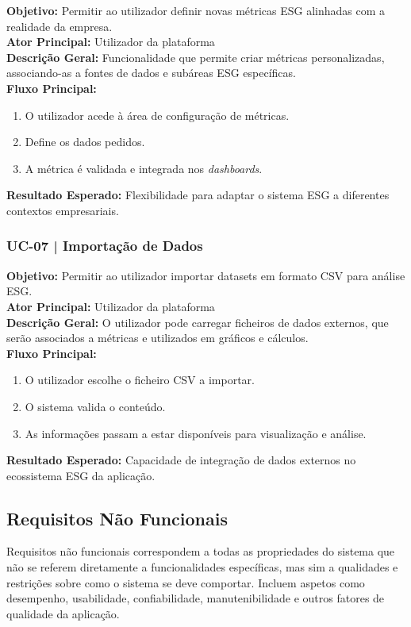 \textbf{Objetivo:} Permitir ao utilizador definir novas métricas ESG alinhadas com a realidade da empresa.\\
\textbf{Ator Principal:} Utilizador da plataforma\\
\textbf{Descrição Geral:} Funcionalidade que permite criar métricas personalizadas, associando-as a fontes de dados e subáreas ESG específicas.\\
\textbf{Fluxo Principal:}
\begin{enumerate}
    \item O utilizador acede à área de configuração de métricas.
    \item Define os dados pedidos.
    \item A métrica é validada e integrada nos \textit{dashboards}.
\end{enumerate}
\textbf{Resultado Esperado:} Flexibilidade para adaptar o sistema ESG a diferentes contextos empresariais.

\subsubsection{UC-07 | Importação de Dados}

\textbf{Objetivo:} Permitir ao utilizador importar datasets em formato CSV para análise ESG.\\
\textbf{Ator Principal:} Utilizador da plataforma\\
\textbf{Descrição Geral:} O utilizador pode carregar ficheiros de dados externos, que serão associados a métricas e utilizados em gráficos e cálculos.\\
\textbf{Fluxo Principal:}
\begin{enumerate}
    \item O utilizador escolhe o ficheiro CSV a importar.
    \item O sistema valida o conteúdo.
    \item As informações passam a estar disponíveis para visualização e análise.
\end{enumerate}
\textbf{Resultado Esperado:} Capacidade de integração de dados externos no ecossistema ESG da aplicação.


\subsection{Requisitos Não Funcionais}

Requisitos não funcionais correspondem a todas as propriedades do sistema que não se referem diretamente a funcionalidades específicas, mas sim a qualidades e restrições sobre como o sistema se deve comportar. Incluem aspetos como desempenho, usabilidade, confiabilidade, manutenibilidade e outros fatores de qualidade da aplicação.

